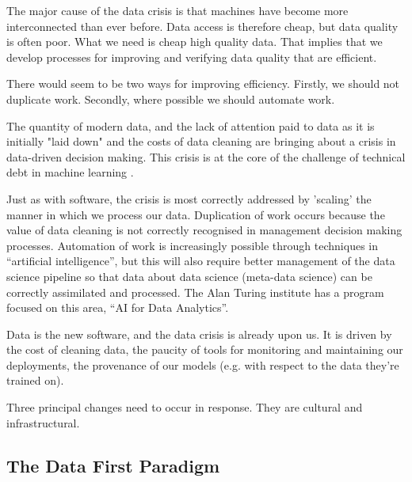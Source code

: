 \documentclass[a4paper]{caesar_book}
\begin{document}
\begin{displayquote}
The major cause of the data crisis is that machines have become more interconnected than ever before. Data access is therefore cheap, but data quality is often poor. What we need is cheap high quality data. That implies that we develop processes for improving and verifying data quality that are efficient.

There would seem to be two ways for improving efficiency. Firstly, we should not duplicate work. Secondly, where possible we should automate work.
\end{displayquote}

The quantity of modern data, and the lack of attention paid to data as it is initially "laid down" and the costs of data cleaning are bringing about a crisis in data-driven decision making. This crisis is at the core of the challenge of technical debt in machine learning .

Just as with software, the crisis is most correctly addressed by 'scaling' the manner in which we process our data. Duplication of work occurs because the value of data cleaning is not correctly recognised in management decision making processes. Automation of work is increasingly possible through techniques in ``artificial intelligence'', but this will also require better management of the data science pipeline so that data about data science (meta-data science) can be correctly assimilated and processed. The Alan Turing institute has a program focused on this area, ``AI for Data Analytics''.

Data is the new software, and the data crisis is already upon us. It is driven by the cost of cleaning data, the paucity of tools for monitoring and maintaining our deployments, the provenance of our models (e.g. with respect to the data they’re trained on).

Three principal changes need to occur in response. They are cultural and infrastructural.

\subsection{The Data First Paradigm}
\end{document}

